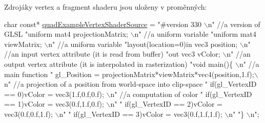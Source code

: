  Zdrojáky vertex a fragment shaderu jsou uloženy v proměnných\-: 
\begin{DoxyCodeInclude}
\textcolor{keywordtype}{char} \textcolor{keyword}{const}* \hyperlink{quadExample_8c_a237a7e498550119b6ce620c687d56f2e}{quadExampleVertexShaderSource} = 
\textcolor{stringliteral}{"#version 330                                                   \(\backslash\)n"} \textcolor{comment}{//a version of GLSL}
\textcolor{comment}{}\textcolor{stringliteral}{"uniform mat4 projectionMatrix;                                 \(\backslash\)n"} \textcolor{comment}{//a uniform variable}
\textcolor{stringliteral}{"uniform mat4 viewMatrix;                                       \(\backslash\)n"} \textcolor{comment}{//a uniform variable}
\textcolor{comment}{}\textcolor{stringliteral}{"layout(location=0)in vec3 position;                            \(\backslash\)n"} \textcolor{comment}{//an input vertex attribute (it is read
       from buffer)}
\textcolor{comment}{}\textcolor{stringliteral}{"out vec3 vColor;                                               \(\backslash\)n"} \textcolor{comment}{//an output vertex attribute (it is
       interpolated in rasterization)}
\textcolor{comment}{}\textcolor{stringliteral}{"void main()\{                                                   \(\backslash\)n"} \textcolor{comment}{//a main function}
\textcolor{comment}{}\textcolor{stringliteral}{"  gl\_Position = projectionMatrix*viewMatrix*vec4(position,1.f);\(\backslash\)n"} \textcolor{comment}{//a projection of a position from
       world-space into clip-space}
\textcolor{comment}{}\textcolor{stringliteral}{"  if(gl\_VertexID == 0)vColor = vec3(1.f,0.f,0.f);              \(\backslash\)n"} \textcolor{comment}{//a computation of color}
\textcolor{stringliteral}{"  if(gl\_VertexID == 1)vColor = vec3(0.f,1.f,0.f);              \(\backslash\)n"}
\textcolor{stringliteral}{"  if(gl\_VertexID == 2)vColor = vec3(0.f,0.f,1.f);              \(\backslash\)n"}
\textcolor{stringliteral}{"  if(gl\_VertexID == 3)vColor = vec3(0.f,1.f,1.f);              \(\backslash\)n"}
\textcolor{stringliteral}{"\}                                                              \(\backslash\)n"};
\end{DoxyCodeInclude}


